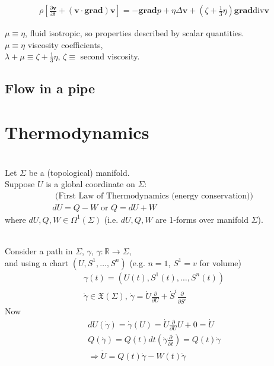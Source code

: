 \documentclass[10pt]{amsart}
\begin{document}
\begin{multicols*}{2}
\begin{equation}
\begin{gathered}
	\rho \left[ \frac{ \partial \mathbf{v}}{ \partial t } + (\mathbf{v} \cdot \textbf{grad} ) \mathbf{v} \right] = -\textbf{grad} p + \eta \Delta \mathbf{v} + (\zeta + \frac{1}{3} \eta) \textbf{grad} \text{div} \mathbf{v}
\end{gathered}
\end{equation}

$\mu \equiv \eta$, fluid isotropic, so properties described by scalar quantities. \\
$\mu \equiv \eta$ viscosity coefficients, \\
$\lambda + \mu \equiv \zeta + \frac{1}{3} \eta$, $\zeta \equiv $ second viscosity.

\subsection{Flow in a pipe}



\section{Thermodynamics}

\quad \\ 
Let $\Sigma$ be a (topological) manifold. \\
Suppose $U$ is a global coordinate on $\Sigma$:
\begin{equation}
\begin{gathered}
\text{ (First Law of Thermodynamics (energy conservation)) } \\
\boxed{ dU = Q - W \text{ or } Q = dU + W }
\end{gathered}
\end{equation}
where $dU, Q, W \in \Omega^1(\Sigma)$ (i.e. $dU, Q, W$ are 1-forms over manifold $\Sigma$).

\quad \\ 
Consider a path in $\Sigma$, $\gamma$, $\gamma : \mathbb{R} \to \Sigma$, \\
and using a chart $(U, S^1, \dots , S^n)$ (e.g. $n=1$, $S^1 = v$ for volume)
\[
\begin{gathered}
\gamma(t) = (U(t), S^1(t), \dots, S^n(t)) \\
\dot{\gamma} \in \mathfrak{X}(\Sigma), \, \dot{\gamma} = \dot{U} \frac{ \partial }{ \partial U} + \dot{S}^i \frac{ \partial }{ \partial S^i} 
\end{gathered}
\]
Now 
\[
\begin{gathered}
dU(\dot{\gamma}) = \dot{\gamma}(U) = \dot{U} \frac{ \partial }{ \partial U} U + 0 = \dot{U} \\
	Q(\dot{\gamma}) = Q(t) dt\left( \dot{\gamma} \frac{ \partial }{ \partial t} \right) = Q(t) \dot{\gamma} \\ 
	\Longrightarrow \dot{U} = Q(t) \dot{\gamma} - W(t) \dot{\gamma}
\end{gathered}
\]


\end{multicols*}
\end{document}
